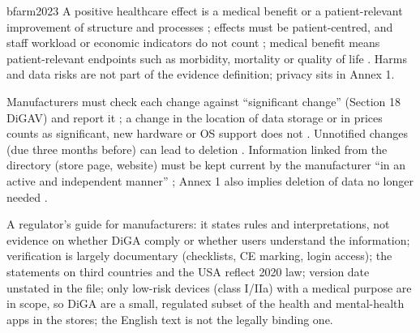 \begin{papercard}{bfarm2023}
 A positive healthcare effect is a medical benefit or a patient-relevant improvement of structure and processes ; effects must be patient-centred, and staff workload or economic indicators do not count ; medical benefit means patient-relevant endpoints such as morbidity, mortality or quality of life . Harms and data risks are not part of the evidence definition; privacy sits in Annex 1.

 Manufacturers must check each change against ``significant change'' (Section 18 DiGAV) and report it ; a change in the location of data storage or in prices counts as significant, new hardware or OS support does not . Unnotified changes (due three months before) can lead to deletion . Information linked from the directory (store page, website) must be kept current by the manufacturer ``in an active and independent manner'' ; Annex 1 also implies deletion of data no longer needed .

 A regulator's guide for manufacturers: it states rules and interpretations, not evidence on whether DiGA comply or whether users understand the information; verification is largely documentary (checklists, CE marking, login access); the statements on third countries and the USA reflect 2020 law; version date unstated in the file; only low-risk devices (class I/IIa) with a medical purpose are in scope, so DiGA are a small, regulated subset of the health and mental-health apps in the stores; the English text is not the legally binding one.


\end{papercard}
